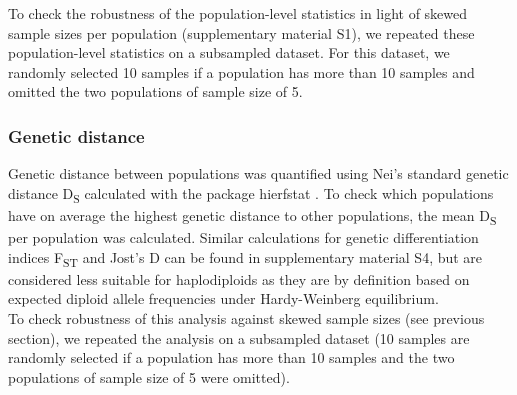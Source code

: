 \documentclass[10pt, twoside]{book} %
\begin{document}
	To check the robustness of the population-level statistics in light of skewed sample sizes per population (supplementary material S1), we repeated these population-level statistics on a subsampled dataset. For this dataset, we randomly selected 10 samples if a population has more than 10 samples and omitted the two populations of sample size of 5.\\
	
	\subsubsection{Genetic distance}
	Genetic distance between populations was quantified using Nei's standard genetic distance D\textsubscript{S} \citep{nei1972} calculated with the package hierfstat \citep{takezaki1996, goudet2020}. To check which populations have on average the highest genetic distance to other populations, the mean D\textsubscript{S} per population was calculated. Similar calculations for genetic differentiation indices F\textsubscript{ST} and Jost's D \citep{weir1984, jost2008, keenan2013} can be found in supplementary material S4, but are considered less suitable for haplodiploids as they are by definition based on expected diploid allele frequencies under Hardy-Weinberg equilibrium.\\
	
	To check robustness of this analysis against skewed sample sizes (see previous section), we repeated the analysis on a subsampled dataset (10 samples are randomly selected if a population has more than 10 samples and the two populations of sample size of 5 were omitted).\\
	
	
\end{document}
